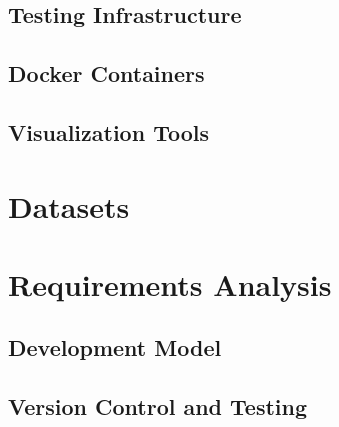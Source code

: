 
\subsection{Testing Infrastructure}
\label{sec:testing-infrastructure}

\subsection{Docker Containers}
\label{sec:docker-containers}

\subsection{Visualization Tools}
\label{sec:visualization-tools}

\section{Datasets}
\label{sec:datasets}

\section{Requirements Analysis}
\label{sec:requirements-analysis}

\subsection{Development Model}
\label{sec:development-model}

\subsection{Version Control and Testing}
\label{sec:version-control-and-testing}

